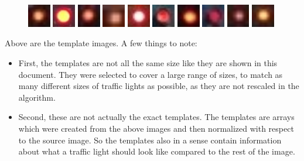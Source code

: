 \documentclass[12pt,letterpaper]{article} \usepackage{fullpage}
\begin{document}
\begin{figure}[htp]
    \centering
    \includegraphics[width=1cm]{../templates/red-light/RL-001.jpg}
    \includegraphics[width=1cm]{../templates/red-light/RL-010.jpg}
    \includegraphics[width=1cm]{../templates/red-light/RL-016.jpg}
    \includegraphics[width=1cm]{../templates/red-light/RL-028.jpg}
    \includegraphics[width=1cm]{../templates/red-light/RL-042.jpg}
    \includegraphics[width=1cm]{../templates/red-light/RL-050.jpg}
    \includegraphics[width=1cm]{../templates/red-light/RL-107.jpg}
    \includegraphics[width=1cm]{../templates/red-light/RL-116.jpg}
    \includegraphics[width=1cm]{../templates/red-light/RL-134.jpg}
    \includegraphics[width=1cm]{../templates/red-light/RL-213.jpg}
\end{figure}

Above are the template images. A few things to note:
\begin{itemize}
    \item First, the templates are not all the same size like they are shown
    in this document. They were selected to cover a large range of sizes, to
    match as many different sizes of traffic lights as possible, as
    they are not rescaled in the algorithm.
    \item Second, these are not actually the exact templates. The templates
    are arrays which were created from the above images and then normalized with
    respect to the source image. So the templates also in a sense contain information
    about what a traffic light should look like compared to the rest of the image.
\end{itemize}
\end{document}
